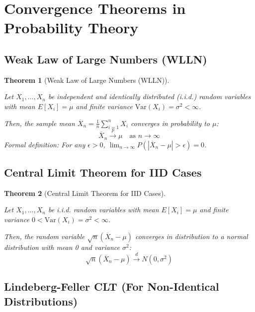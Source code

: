 \documentclass[
  letterpaper,
  DIV=11,
  numbers=noendperiod]{scrreprt}
\renewcommand{\[}{\begin{equation}}
\renewcommand{\]}{\end{equation}}
\theoremstyle{definition}
\theoremstyle{plain}
\theoremstyle{plain}
\theoremstyle{plain}
\newtheorem{theorem}{Theorem}[chapter]
\theoremstyle{definition}
\theoremstyle{plain}
\theoremstyle{remark}
\begin{document}
\section{Convergence Theorems in Probability
Theory}\label{convergence-theorems-in-probability-theory}

\subsection{Weak Law of Large Numbers
(WLLN)}\label{weak-law-of-large-numbers-wlln}

\begin{theorem}[Weak Law of Large Numbers
(WLLN)]\protect\hypertarget{thm-lln}{}\label{thm-lln}

Let \(X_1, \dots, X_n\) be independent and identically distributed
(i.i.d.) random variables with mean \(E[X_i] = \mu\) and finite variance
\(\text{Var}(X_i) = \sigma^2 < \infty\).

Then, the sample mean \(\overline{X}_n = \frac{1}{n}\sum_{i=1}^n X_i\)
converges in probability to \(\mu\): \[
\overline{X}_n \xrightarrow{p} \mu \quad \text{as } n \to \infty
\] Formal definition: For any \(\epsilon > 0\),
\(\lim_{n \to \infty} P(|\overline{X}_n - \mu| > \epsilon) = 0\).

\end{theorem}

\subsection{Central Limit Theorem for IID
Cases}\label{central-limit-theorem-for-iid-cases}

\begin{theorem}[Central Limit Theorem for IID
Cases]\protect\hypertarget{thm-clt}{}\label{thm-clt}

Let \(X_1, \dots, X_n\) be i.i.d. random variables with mean
\(E[X_i] = \mu\) and finite variance
\(0 < \text{Var}(X_i) = \sigma^2 < \infty\).

Then, the random variable \(\sqrt{n}(\overline{X}_n - \mu)\) converges
in distribution to a normal distribution with mean 0 and variance
\(\sigma^2\): \[
\sqrt{n}(\overline{X}_n - \mu) \xrightarrow{d} N(0, \sigma^2)
\]

\end{theorem}

\subsection{Lindeberg-Feller CLT (For Non-Identical
Distributions)}\label{lindeberg-feller-clt-for-non-identical-distributions}
\end{document}
